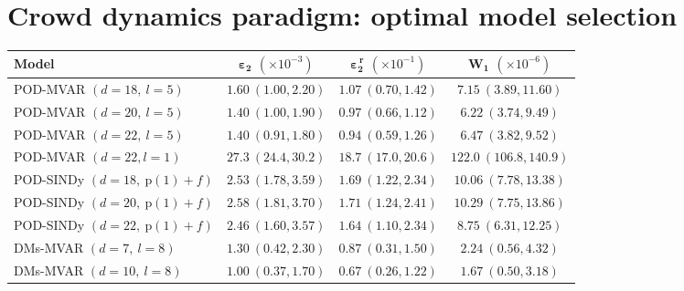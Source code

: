 \documentclass{article}
\begin{document}
\section{Crowd dynamics paradigm: optimal model selection}
\label{app:results_insights}

\begin{table}[ht]
\centering
\setlength{\tabcolsep}{2pt}
{ %
\small
\begin{tabularx}{\textwidth}{lCCC}
\toprule
\textbf{Model} 
& $\boldsymbol{\varepsilon_2}$ $(\times 10^{-3})$
& $\boldsymbol{\varepsilon_2^{\,r}}$ $(\times 10^{-1})$
& $\boldsymbol{W_1}$ $(\times 10^{-6})$ \\
\midrule
POD-MVAR $(d=18,\ l=5)$ 
& $1.60~(1.00,2.20)$ 
& $1.07~(0.70,1.42)$  
& $7.15~(3.89,11.60)$ \\

POD-MVAR $(d=20,\ l=5)$ 
& $1.40~(1.00,1.90)$ 
& $0.97~(0.66,1.12)$  
& $6.22~(3.74,9.49)$ \\

POD-MVAR $(d=22,\ l=5)$ 
& $1.40~(0.91,1.80)$ 
& $0.94~(0.59,1.26)$  
& $6.47~(3.82,9.52)$ \\

POD-MVAR $(d=22, l=1)$ & $27.3~(24.4,30.2)$ 
& $18.7~(17.0,20.6)$ 
& $122.0~(106.8,140.9)$\\


POD-SINDy $(d=18,\ \mathrm{p}(1)+f)$ 
& $2.53~(1.78,3.59)$ 
& $1.69~(1.22,2.34)$ 
& $10.06~(7.78,13.38)$ \\

POD-SINDy $(d=20,\ \mathrm{p}(1)+f)$ 
& $2.58~(1.81,3.70)$ 
& $1.71~(1.24,2.41)$ 
& $10.29~(7.75,13.86)$ \\

POD-SINDy $(d=22,\ \mathrm{p}(1)+f)$ 
& $2.46~(1.60,3.57)$ 
& $1.64~(1.10,2.34)$ 
& $8.75~(6.31,12.25)$ \\


DMs-MVAR $(d=7,\ l=8)$ 
& $1.30~(0.42,2.30)$ 
& $0.87~(0.31,1.50)$  
& $2.24~(0.56,4.32)$ \\

DMs-MVAR $(d=10,\ l=8)$ 
& $1.00~(0.37,1.70)$ 
& $0.67~(0.26,1.22)$  
& $1.67~(0.50,3.18)$ \\



\end{tabularx}}
\end{table}
\end{document}
